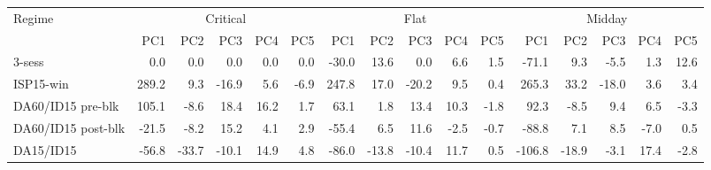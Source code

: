 \begin{tabular}{l r r r r r r r r r r r r r r r}
\toprule
Regime & \multicolumn{5}{c}{Critical} & \multicolumn{5}{c}{Flat} & \multicolumn{5}{c}{Midday} \\
\cmidrule(lr){2-6}\cmidrule(lr){7-11}\cmidrule(lr){12-16}
 & PC1 & PC2 & PC3 & PC4 & PC5 & PC1 & PC2 & PC3 & PC4 & PC5 & PC1 & PC2 & PC3 & PC4 & PC5 \\
\midrule
3-sess & 0.0 & 0.0 & 0.0 & 0.0 & 0.0 & -30.0 & 13.6 & 0.0 & 6.6 & 1.5 & -71.1 & 9.3 & -5.5 & 1.3 & 12.6 \\
ISP15-win & 289.2 & 9.3 & -16.9 & 5.6 & -6.9 & 247.8 & 17.0 & -20.2 & 9.5 & 0.4 & 265.3 & 33.2 & -18.0 & 3.6 & 3.4 \\
DA60/ID15 pre-blk & 105.1 & -8.6 & 18.4 & 16.2 & 1.7 & 63.1 & 1.8 & 13.4 & 10.3 & -1.8 & 92.3 & -8.5 & 9.4 & 6.5 & -3.3 \\
DA60/ID15 post-blk & -21.5 & -8.2 & 15.2 & 4.1 & 2.9 & -55.4 & 6.5 & 11.6 & -2.5 & -0.7 & -88.8 & 7.1 & 8.5 & -7.0 & 0.5 \\
DA15/ID15 & -56.8 & -33.7 & -10.1 & 14.9 & 4.8 & -86.0 & -13.8 & -10.4 & 11.7 & 0.5 & -106.8 & -18.9 & -3.1 & 17.4 & -2.8 \\
\bottomrule
\end{tabular}